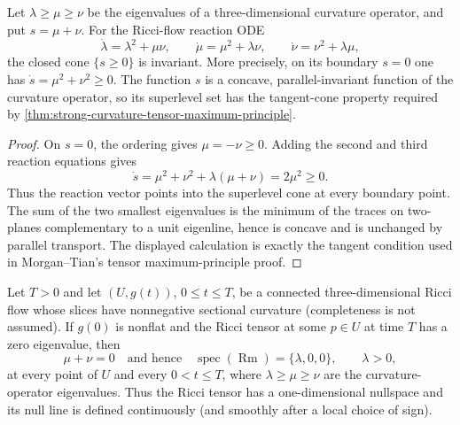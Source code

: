 \begin{lemma}
\label{lem:two-smallest-curvature-cone-invariant}
\notready
Let $\lambda\ge\mu\ge\nu$ be the eigenvalues of a three-dimensional
curvature operator, and put $s=\mu+\nu$.  For the Ricci-flow reaction ODE
\[
 \dot\lambda=\lambda^2+\mu\nu,\qquad
 \dot\mu=\mu^2+\lambda\nu,\qquad
 \dot\nu=\nu^2+\lambda\mu,
\]
the closed cone $\{s\ge0\}$ is invariant.  More precisely, on its boundary
 $s=0$ one has $\dot s=\mu^2+\nu^2\ge0$.  The function $s$ is a concave,
parallel-invariant function of the curvature operator, so its superlevel set
has the tangent-cone property required by
\ref{thm:strong-curvature-tensor-maximum-principle}.
\end{lemma}

\begin{proof}
On $s=0$, the ordering gives $\mu=-\nu\ge0$.  Adding the second and third
reaction equations gives
\[
 \dot s=\mu^2+\nu^2+\lambda(\mu+\nu)=2\mu^2\ge0.
\]
Thus the reaction vector points into the superlevel cone at every boundary
point.  The sum of the two smallest eigenvalues is the minimum of the traces
on two-planes complementary to a unit eigenline, hence is concave and is
unchanged by parallel transport.  The displayed calculation is exactly the
tangent condition used in Morgan--Tian's tensor maximum-principle proof.
\end{proof}

\begin{lemma}
\label{lem:curvature-nullity-propagation}
\notready
Let $T>0$ and let $(U,g(t))$, $0\le t\le T$, be a connected
three-dimensional Ricci flow whose slices have nonnegative sectional
curvature (completeness is not assumed).  If $g(0)$ is nonflat and the
Ricci tensor at some $p\in U$ at time $T$ has a zero eigenvalue, then
\[
 \mu+\nu=0
 \quad\text{and hence}\quad
 \operatorname{spec}(\operatorname{Rm})=\{\lambda,0,0\},\qquad\lambda>0,
\]
at every point of $U$ and every $0<t\le T$, where
$\lambda\ge\mu\ge\nu$ are the curvature-operator eigenvalues.  Thus the
Ricci tensor has a one-dimensional nullspace and its null line is defined
continuously (and smoothly after a local choice of sign).
\end{lemma}

